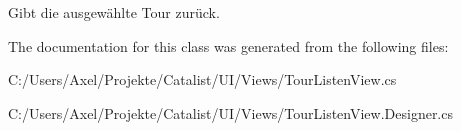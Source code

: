 Gibt die ausgewählte Tour zurück. 



The documentation for this class was generated from the following files\+:\begin{DoxyCompactItemize}
\item 
C\+:/\+Users/\+Axel/\+Projekte/\+Catalist/\+U\+I/\+Views/Tour\+Listen\+View.\+cs\item 
C\+:/\+Users/\+Axel/\+Projekte/\+Catalist/\+U\+I/\+Views/Tour\+Listen\+View.\+Designer.\+cs\end{DoxyCompactItemize}
